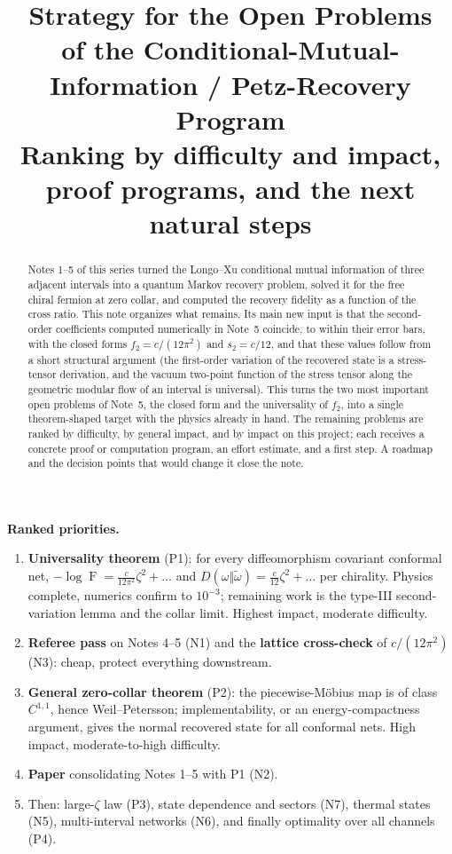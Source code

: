 \documentclass[11pt]{article}
\title{\vspace{-1.55cm}\color{navy}\bfseries
Strategy for the Open Problems\\[0.25em]
\Large of the Conditional-Mutual-Information / Petz-Recovery Program\\[0.5em]
\large Ranking by difficulty and impact, proof programs, and the next natural steps}
\author{}
\date{}
\theoremstyle{accent}
\theoremstyle{definition}
\newcommand{\Fid}{\operatorname{F}}
\begin{document}
\maketitle
\vspace{-1.55em}

\begin{abstract}
Notes 1--5 of this series turned the Longo--Xu conditional mutual information of three adjacent intervals into a quantum Markov recovery problem, solved it for the free chiral fermion at zero collar, and computed the recovery fidelity as a function of the cross ratio.  This note organizes what remains.  Its main new input is that the second-order coefficients computed numerically in Note~5 coincide, to within their error bars, with the closed forms \(f_2=c/(12\pi^2)\) and \(s_2=c/12\), and that these values follow from a short structural argument (the first-order variation of the recovered state is a stress-tensor derivation, and the vacuum two-point function of the stress tensor along the geometric modular flow of an interval is universal).  This turns the two most important open problems of Note~5, the closed form and the universality of \(f_2\), into a single theorem-shaped target with the physics already in hand.  The remaining problems are ranked by difficulty, by general impact, and by impact on this project; each receives a concrete proof or computation program, an effort estimate, and a first step.  A roadmap and the decision points that would change it close the note.
\end{abstract}

\begin{mainbox}
\textbf{Ranked priorities.}
\begin{enumerate}[leftmargin=1.6em,itemsep=1pt]
\item \textbf{Universality theorem} (P1): for every diffeomorphism covariant conformal net, \(-\log\Fid=\frac{c}{12\pi^2}\zeta^2+\dots\) and \(D(\omega\Vert\widetilde\omega)=\frac{c}{12}\zeta^2+\dots\) per chirality.  Physics complete, numerics confirm to \(10^{-3}\); remaining work is the type-III second-variation lemma and the collar limit.  Highest impact, moderate difficulty.
\item \textbf{Referee pass} on Notes 4--5 (N1) and the \textbf{lattice cross-check} of \(c/(12\pi^2)\) (N3): cheap, protect everything downstream.
\item \textbf{General zero-collar theorem} (P2): the piecewise-M\"obius map is of class \(C^{1,1}\), hence Weil--Petersson; implementability, or an energy-compactness argument, gives the normal recovered state for all conformal nets.  High impact, moderate-to-high difficulty.
\item \textbf{Paper} consolidating Notes 1--5 with P1 (N2).
\item Then: large-\(\zeta\) law (P3), state dependence and sectors (N7), thermal states (N5), multi-interval networks (N6), and finally optimality over all channels (P4).
\end{enumerate}
\end{mainbox}
\end{document}
